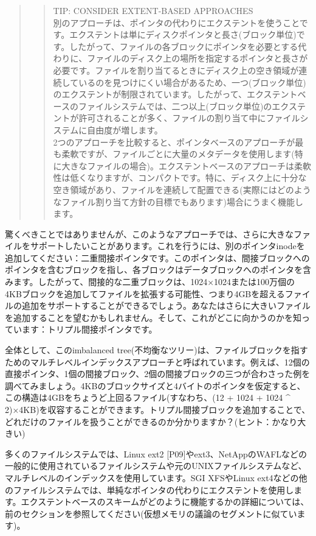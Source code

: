 \begin{quote}
\begin{quote}
TIP: CONSIDER EXTENT-BASED APPROACHES\\
別のアプローチは、ポインタの代わりにエクステントを使うことです。エクステントは単にディスクポインタと長さ(ブロック単位)です。したがって、ファイルの各ブロックにポインタを必要とする代わりに、ファイルのディスク上の場所を指定するポインタと長さが必要です。ファイルを割り当てるときにディスク上の空き領域が連続しているのを見つけにくい場合があるため、一つ(ブロック単位)のエクステントが制限されています。したがって、エクステントベースのファイルシステムでは、二つ以上(ブロック単位)のエクステントが許可されることが多く、ファイルの割り当て中にファイルシステムに自由度が増します。\\
2つのアプローチを比較すると、ポインタベースのアプローチが最も柔軟ですが、ファイルごとに大量のメタデータを使用します(特に大きなファイルの場合)。エクステントベースのアプローチは柔軟性は低くなりますが、コンパクトです。特に、ディスク上に十分な空き領域があり、ファイルを連続して配置できる(実際にはどのようなファイル割り当て方針の目標でもあります)場合にうまく機能します。
\end{quote}
\end{quote}

驚くべきことではありませんが、このようなアプローチでは、さらに大きなファイルをサポートしたいことがあります。これを行うには、別のポインタinodeを追加してください：二重間接ポインタです。このポインタは、間接ブロックへのポインタを含むブロックを指し、各ブロックはデータブロックへのポインタを含みます。したがって、間接的な二重ブロックは、1024×1024または100万個の4KBブロックを追加してファイルを拡張する可能性、つまり4GBを超えるファイルの追加をサポートすることができるでしょう。あなたはさらに大きいファイルを追加することを望むかもしれません。そして、これがどこに向かうのかを知っています：トリプル間接ポインタです。

全体として、このimbalanced
tree(不均衡なツリー)は、ファイルブロックを指すためのマルチレベルインデックスアプローチと呼ばれています。例えば、12個の直接ポインタ、1個の間接ブロック、2個の間接ブロックの三つが合わさった例を調べてみましょう。4KBのブロックサイズと4バイトのポインタを仮定すると、この構造は4GBをちょうど上回るファイル(すなわち、(12
+ 1024 + 1024 \^{}
2)×4KB)を収容することができます。トリプル間接ブロックを追加することで、どれだけのファイルを扱うことができるのか分かりますか？(ヒント：かなり大きい)

多くのファイルシステムでは、Linux ext2
{[}P09{]}やext3、NetAppのWAFLなどの一般的に使用されているファイルシステムや元のUNIXファイルシステムなど、マルチレベルのインデックスを使用しています。SGI
XFSやLinux
ext4などの他のファイルシステムでは、単純なポインタの代わりにエクステントを使用します。エクステントベースのスキームがどのように機能するかの詳細については、前のセクションを参照してください(仮想メモリの議論のセグメントに似ています)。

